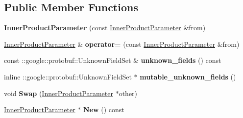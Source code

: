 \subsection*{Public Member Functions}
\begin{DoxyCompactItemize}
\item 
\mbox{\label{classcaffe_1_1_inner_product_parameter_a66337224dbcab154d6197f4fe96eb9d7}} 
{\bfseries Inner\+Product\+Parameter} (const \mbox{\hyperlink{classcaffe_1_1_inner_product_parameter}{Inner\+Product\+Parameter}} \&from)
\item 
\mbox{\label{classcaffe_1_1_inner_product_parameter_a09d35bbdaf492262bc11d6a538e9a5e2}} 
\mbox{\hyperlink{classcaffe_1_1_inner_product_parameter}{Inner\+Product\+Parameter}} \& {\bfseries operator=} (const \mbox{\hyperlink{classcaffe_1_1_inner_product_parameter}{Inner\+Product\+Parameter}} \&from)
\item 
\mbox{\label{classcaffe_1_1_inner_product_parameter_ace361952fab5c17ff421414879fadd5c}} 
const \+::google\+::protobuf\+::\+Unknown\+Field\+Set \& {\bfseries unknown\+\_\+fields} () const
\item 
\mbox{\label{classcaffe_1_1_inner_product_parameter_a6736c62857766f66be151eaf0bf4733a}} 
inline \+::google\+::protobuf\+::\+Unknown\+Field\+Set $\ast$ {\bfseries mutable\+\_\+unknown\+\_\+fields} ()
\item 
\mbox{\label{classcaffe_1_1_inner_product_parameter_abadd64de7f2b318975e8473d24355945}} 
void {\bfseries Swap} (\mbox{\hyperlink{classcaffe_1_1_inner_product_parameter}{Inner\+Product\+Parameter}} $\ast$other)
\item 
\mbox{\label{classcaffe_1_1_inner_product_parameter_afaccccca9b33c16aca80c7ed9a059fdd}} 
\mbox{\hyperlink{classcaffe_1_1_inner_product_parameter}{Inner\+Product\+Parameter}} $\ast$ {\bfseries New} () const
\item 
\mbox{\label{classcaffe_1_1_inner_product_parameter_a5838e8caf825837bdfcde39ecab5f6f6}} 

\end{DoxyCompactItemize}
